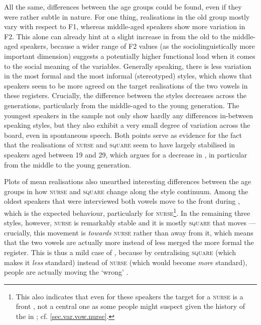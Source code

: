 All the same, differences between the age groups could be found, even if they were rather subtle in nature.
For one thing, realisations in the old group mostly vary with respect to F1, whereas middle-aged speakers show more variation in F2.
This alone can already hint at a slight increase in  from the old to the middle-aged speakers, because a wider range of F2 values (as the sociolinguistically more important dimension) suggests a potentially higher functional load when it comes to the social meaning of the variables.
Generally speaking, there is less variation in the most formal and the most informal (stereotyped) styles, which shows that speakers seem to be more agreed on the target realisations of the two vowels in these registers.
Crucially, the difference between the styles decreases across the generations, particularly from the middle-aged to the young generation.
The youngest speakers in the sample not only show hardly any differences in-between speaking styles, but they also exhibit a very small degree of variation across the board, even in spontaneous speech.
Both points serve as evidence for the fact that the realisations of \textsc{nurse} and \textsc{square} seem to have largely stabilised in speakers aged between 19 and 29, which argues for a decrease in , in particular from the middle to the young generation.

Plots of mean  realisations also unearthed interesting differences between the age groups in how \textsc{nurse} and \textsc{square} change along the style continuum.
Among the oldest speakers that were interviewed both vowels move to the front during , which is the expected behaviour, particularly for \textsc{nurse}\footnote{This also indicates that even for these speakers the target for a  \textsc{nurse} is a front , not a central one as some people might suspect given the history of the  in ; cf. \ref{sec.var.vow.nurse}.}.
In the remaining three styles, however, \textsc{nurse} is remarkably stable and it is mostly \textsc{square} that moves --- crucially, this movement is \emph{towards} \textsc{nurse} rather than away from it, which means that the two vowels are actually more instead of less merged the more formal the register.
This is thus a mild case of , because by centralising \textsc{square} (which makes it \emph{less} standard) instead of \textsc{nurse} (which would become \emph{more} standard), people are actually moving the `wrong' .

